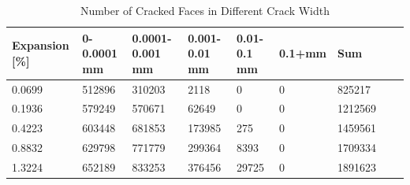 
\begin{table}[ht!]
  \caption{Number of Cracked Faces in Different Crack Width}
    \centering
    \begin{tabular}{| p{2.0cm} | p{1.6cm} | p{1.6cm} | p{1.6cm} | p{1.6cm} | p{1.6cm} | p{1.6cm} | p{1.6cm} | p{2.0cm} | }
    \hline

	Expansion [\%] & 0-0.0001 mm & 0.0001-0.001 mm & 0.001-0.01 mm & 0.01-0.1 mm & 0.1+mm & Sum \\ \hline

    0.0699 &	512896 &	310203 &	2118 &  	0 &	0 &	825217\\ \hline
    0.1936 &	579249 &	570671 &	62649 &	    0 &	0 &	1212569\\ \hline
    0.4223 &	603448 &	681853 &	173985 &	275 &	0 &	1459561\\ \hline
    0.8832 &	629798 &	771779 &	299364 &	8393 &	0 &	1709334\\ \hline
    1.3224 &	652189 &	833253 &	376456 &	29725 &	0 &	1891623\\ \hline

    \end{tabular}

    \label{}
\end{table}

